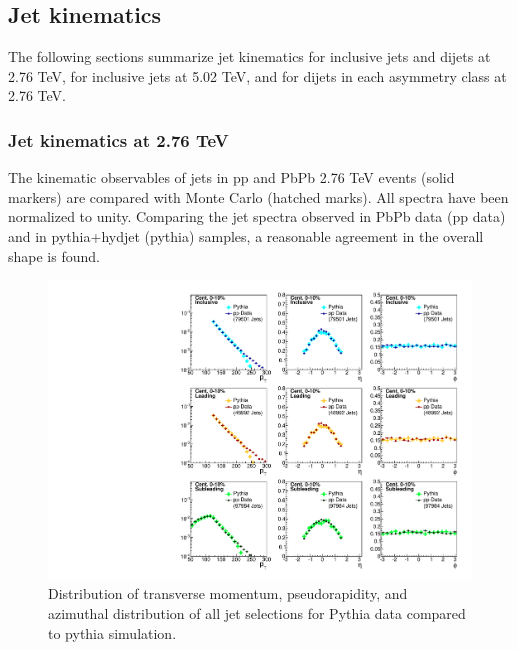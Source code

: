 

\subsection{Jet kinematics}

The following sections summarize jet kinematics for inclusive jets and dijets at 2.76 TeV, for inclusive jets at 5.02 TeV, and for dijets in each asymmetry class at 2.76 TeV.

\subsubsection{Jet kinematics at 2.76 TeV}
\label{app:kinematics_run1}

The kinematic observables of jets in pp and PbPb 2.76 TeV events (solid markers) are compared with Monte Carlo (hatched marks). All spectra have been normalized to unity. Comparing the jet spectra observed in PbPb data (pp data) and in {\sc pythia+hydjet} ({\sc pythia}) samples, a reasonable agreement in the overall shape is found.
 
 
 \begin{figure}[h!]
 \begin{center}
 \includegraphics[width=.75\textwidth]{figures/Appendices/JetSpectra_MC_Data_Pythia_RecoJet_JetEtaCut16.pdf}
 \caption{Distribution of transverse momentum, pseudorapidity, and azimuthal distribution of all jet selections for Pythia data compared to {\sc pythia} simulation.}
  \label{fig:ppJetPt}
 \end{center}
 \end{figure}
 

